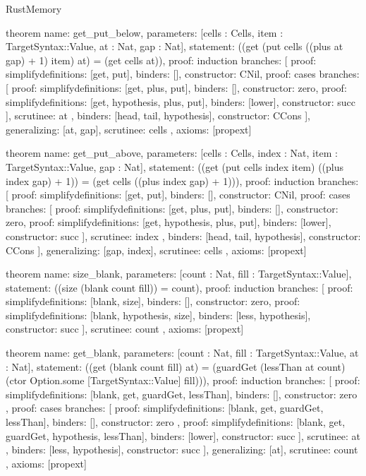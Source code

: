 \begin{lexlean}{RustMemory}
\begin{semanticmodule}
theorem{
  name: get_put_below,
  parameters: [cells : Cells, item : TargetSyntax::Value, at : Nat, gap : Nat],
  statement: ((get (put cells ((plus at gap) + 1) item) at) = (get cells at)),
  proof: induction{
    branches: [
      {proof: simplify{definitions: [get, put]}, binders: [], constructor: CNil},
      {
        proof: cases{
          branches: [
            {proof: simplify{definitions: [get, plus, put]}, binders: [], constructor: zero},
            {
              proof: simplify{definitions: [get, hypothesis, plus, put]},
              binders: [lower],
              constructor: succ
            }
          ],
          scrutinee: at
        },
        binders: [head, tail, hypothesis],
        constructor: CCons
      }
    ],
    generalizing: [at, gap],
    scrutinee: cells
  },
  axioms: [propext]
}

theorem{
  name: get_put_above,
  parameters: [cells : Cells, index : Nat, item : TargetSyntax::Value, gap : Nat],
  statement: ((get (put cells index item) ((plus index gap) + 1)) = (get cells ((plus index gap) + 1))),
  proof: induction{
    branches: [
      {proof: simplify{definitions: [get, put]}, binders: [], constructor: CNil},
      {
        proof: cases{
          branches: [
            {proof: simplify{definitions: [get, plus, put]}, binders: [], constructor: zero},
            {
              proof: simplify{definitions: [get, hypothesis, plus, put]},
              binders: [lower],
              constructor: succ
            }
          ],
          scrutinee: index
        },
        binders: [head, tail, hypothesis],
        constructor: CCons
      }
    ],
    generalizing: [gap, index],
    scrutinee: cells
  },
  axioms: [propext]
}

theorem{
  name: size_blank,
  parameters: [count : Nat, fill : TargetSyntax::Value],
  statement: ((size (blank count fill)) = count),
  proof: induction{
    branches: [
      {proof: simplify{definitions: [blank, size]}, binders: [], constructor: zero},
      {
        proof: simplify{definitions: [blank, hypothesis, size]},
        binders: [less, hypothesis],
        constructor: succ
      }
    ],
    scrutinee: count
  },
  axioms: [propext]
}

theorem{
  name: get_blank,
  parameters: [count : Nat, fill : TargetSyntax::Value, at : Nat],
  statement: ((get (blank count fill) at) = (guardGet (lessThan at count) (ctor Option.some [TargetSyntax::Value] fill))),
  proof: induction{
    branches: [
      {
        proof: simplify{definitions: [blank, get, guardGet, lessThan]},
        binders: [],
        constructor: zero
      },
      {
        proof: cases{
          branches: [
            {
              proof: simplify{definitions: [blank, get, guardGet, lessThan]},
              binders: [],
              constructor: zero
            },
            {
              proof: simplify{definitions: [blank, get, guardGet, hypothesis, lessThan]},
              binders: [lower],
              constructor: succ
            }
          ],
          scrutinee: at
        },
        binders: [less, hypothesis],
        constructor: succ
      }
    ],
    generalizing: [at],
    scrutinee: count
  },
  axioms: [propext]
}


\end{semanticmodule}
\end{lexlean}
